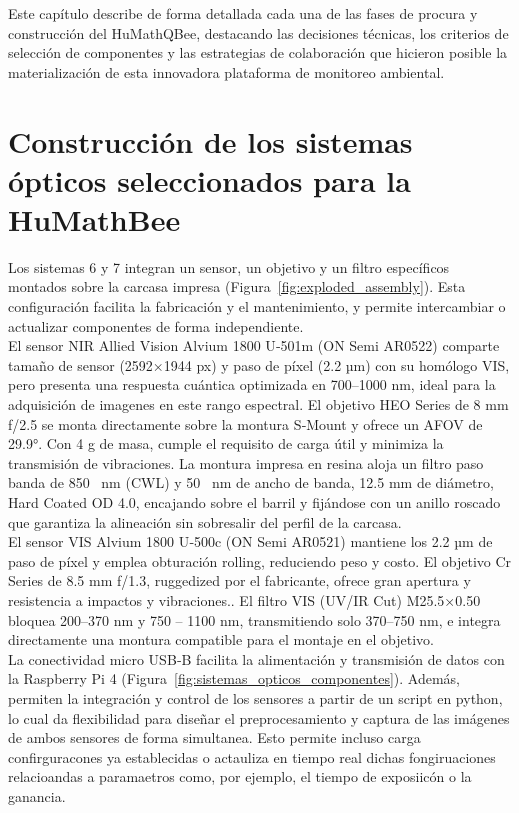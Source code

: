 \noindent Este capítulo describe de forma detallada cada una de las fases de procura y construcción del HuMath\textregistered QBee, destacando las decisiones técnicas, los criterios de selección de componentes y las estrategias de colaboración que hicieron posible la materialización de esta innovadora plataforma de monitoreo ambiental.\\



\section{Construcción de los sistemas ópticos seleccionados para la HuMath\textregistered Bee}

\noindent Los sistemas 6 y 7 integran un sensor, un objetivo y un filtro específicos montados sobre la carcasa impresa (Figura~\ref{fig:exploded_assembly}). Esta configuración facilita la fabricación y el mantenimiento, y permite intercambiar o actualizar componentes de forma independiente.\\

\noindent El sensor NIR Allied Vision Alvium 1800 U‑501m (ON Semi AR0522) comparte tamaño de sensor (2592×1944 px) y paso de píxel (2.2 µm) con su homólogo VIS, pero presenta una respuesta cuántica optimizada en 700–1000 nm, ideal para la adquisición de imagenes en este rango espectral. El objetivo HEO Series de 8 mm f/2.5 se monta directamente sobre la montura S‑Mount y ofrece un AFOV de 29.9°. Con 4 g de masa, cumple el requisito de carga útil y minimiza la transmisión de vibraciones. La montura impresa en resina aloja un filtro paso banda de 850 \SI{}{nm} (CWL) y 50 \SI{}{nm} de ancho de banda, 12.5 mm de diámetro, Hard Coated OD 4.0, encajando sobre el barril y fijándose con un anillo roscado que garantiza la alineación sin sobresalir del perfil de la carcasa.\\

\noindent El sensor VIS Alvium 1800 U‑500c (ON Semi AR0521) mantiene los 2.2 µm de paso de píxel y emplea obturación rolling, reduciendo peso y costo. El objetivo Cr Series de 8.5 mm f/1.3, ruggedized por el fabricante, ofrece gran apertura y resistencia a impactos y vibraciones.. El filtro VIS (UV/IR Cut) M25.5×0.50 bloquea 200–370 nm y 750 – 1100 nm, transmitiendo solo 370–750 nm, e integra directamente una montura compatible para el montaje en el objetivo.\\

\noindent La conectividad micro USB‑B facilita la alimentación y transmisión de datos con la Raspberry Pi 4 (Figura~\ref{fig:sistemas_opticos_componentes}). Además, permiten la integración y control de los sensores a partir de un script en python, lo cual da flexibilidad para diseñar el preprocesamiento y captura de las imágenes de ambos sensores de forma simultanea. Esto permite incluso carga confirguracones ya establecidas o actauliza en tiempo real dichas fongiruaciones relacioandas a paramaetros como, por ejemplo, el tiempo de exposiicón o la ganancia.

